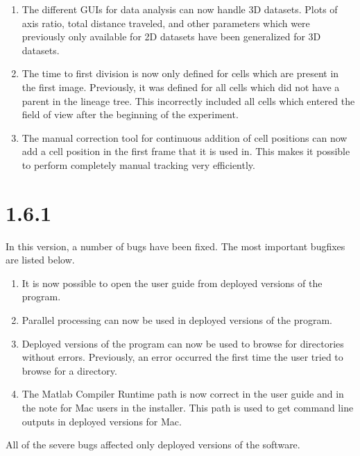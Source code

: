 \documentclass[a4paper, oneside, onecolumn, 11pt]{article}
\begin{document}
\begin{enumerate}
\item The different GUIs for data analysis can now handle 3D datasets. Plots of axis ratio, total distance traveled, and other parameters which were previously only available for 2D datasets have been generalized for 3D datasets.
\item The time to first division is now only defined for cells which are present in the first image. Previously, it was defined for all cells which did not have a parent in the lineage tree. This incorrectly included all cells which entered the field of view after the beginning of the experiment.
\item The manual correction tool for continuous addition of cell positions can now add a cell position in the first frame that it is used in. This makes it possible to perform completely manual tracking very efficiently.
\end{enumerate}

\section*{1.6.1}

In this version, a number of bugs have been fixed. The most important bugfixes are listed below.

\begin{enumerate}
\item It is now possible to open the user guide from deployed versions of the program.
\item Parallel processing can now be used in deployed versions of the program.
\item Deployed versions of the program can now be used to browse for directories without errors. Previously, an error occurred the first time the user tried to browse for a directory.
\item The Matlab Compiler Runtime path is now correct in the user guide and in the note for Mac users in the installer. This path is used to get command line outputs in deployed versions for Mac.
\end{enumerate}

All of the severe bugs affected only deployed versions of the software.
\end{document}

